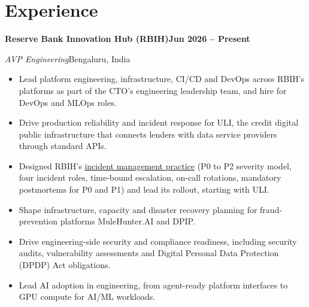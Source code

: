 \documentclass[10pt,a4paper]{article}
\newcommand{\job}[4]{%
  \par\addvspace{0.9ex}%
  {\bfseries #1}\hfill{\bfseries #2}\par
  {\itshape #3}\hfill{\color{muted}#4}\par}
\begin{document}
\section{Experience}

\job{Reserve Bank Innovation Hub (RBIH)}{Jun 2026 -- Present}{AVP Engineering}{Bengaluru, India}
\begin{itemize}
  \item Lead platform engineering, infrastructure, CI/CD and DevOps across RBIH's platforms as part of the CTO's engineering leadership team, and hire for DevOps and MLOps roles.
  \item Drive production reliability and incident response for ULI, the credit digital public infrastructure that connects lenders with data service providers through standard APIs.
  \item Designed RBIH's \href{https://rajatgupta.work/projects/rbih-incident-management/}{incident management practice} (P0 to P2 severity model, four incident roles, time-bound escalation, on-call rotations, mandatory postmortems for P0 and P1) and lead its rollout, starting with ULI.
  \item Shape infrastructure, capacity and disaster recovery planning for fraud-prevention platforms MuleHunter.AI and DPIP.
  \item Drive engineering-side security and compliance readiness, including security audits, vulnerability assessments and Digital Personal Data Protection (DPDP) Act obligations.
  \item Lead AI adoption in engineering, from agent-ready platform interfaces to GPU compute for AI/ML workloads.
\end{itemize}
\end{document}
